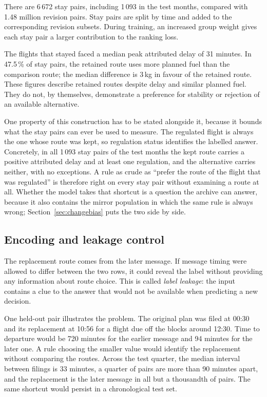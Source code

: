 \documentclass[preprint,authoryear,12pt]{elsarticle}
\begin{document}
There are 6\,672 stay pairs, including 1\,093 in the test months,
compared with 1.48 million revision pairs. Stay pairs are split by time
and added to the corresponding revision subsets. During training,
an increased group weight gives each stay pair a larger contribution
to the ranking loss.

The flights that stayed faced a median peak attributed delay of
31 minutes. In 47.5\,\% of stay pairs, the retained route uses more
planned fuel than the comparison route; the median difference is
3\,kg in favour of the retained route. These figures describe retained
routes despite delay and similar planned fuel. They do not, by
themselves, demonstrate a preference for stability or rejection of an
available alternative.

One property of this construction has to be stated alongside it,
because it bounds what the stay pairs can ever be used to measure. The
regulated flight is always the one whose route was kept, so regulation
status identifies the labelled answer. Concretely, in all 1\,093 stay
pairs of the test months the kept route carries a positive attributed
delay and at least one regulation, and the alternative carries neither,
with no exceptions. A rule as crude as ``prefer the route of the flight
that was regulated'' is therefore right on every stay pair without
examining a route at all. Whether the model takes that shortcut is a
question the archive can answer, because it also contains the mirror
population in which the same rule is always wrong;
Section~\ref{sec:changebias} puts the two side by side.

\subsection{Encoding and leakage control}
\label{sec:leakage}

The replacement route comes from the later message. If message timing
were allowed to differ between the two rows, it could reveal the label
without providing any information about route choice. This is called
\emph{label leakage}: the input contains a clue to the answer that would
not be available when predicting a new decision.

One held-out pair illustrates the problem. The original plan was filed
at 00:30 and its replacement at 10:56 for a flight due off the blocks
around 12:30. Time to departure would be 720 minutes for the earlier
message and 94 minutes for the later one. A rule choosing the smaller
value would identify the replacement without comparing the routes.
Across the test quarter, the median interval between filings is
33 minutes, a quarter of pairs are more than 90 minutes apart, and the
replacement is the later message in all but a thousandth of pairs.
The same shortcut would persist in a chronological test set.
\end{document}
